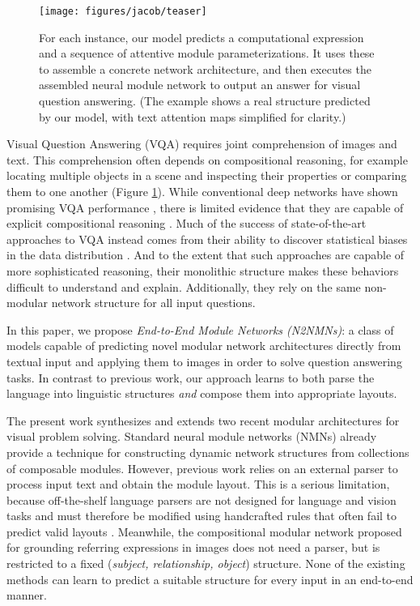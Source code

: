 \documentclass[10pt,twocolumn,letterpaper]{article}
\begin{document}
\begin{figure}[t]
\center
\texttt{[image: figures/jacob/teaser]}\vspace{-0.8cm}
\caption{For each instance, our model predicts a computational expression and a sequence of attentive module parameterizations. It uses these to assemble a concrete network architecture, and then executes the assembled neural module network to output an answer for visual question answering. (The
example shows a real structure predicted by our model, with text attention maps
simplified for clarity.)}
\label{fig:teaser}
\vspace{-0.5cm}
\end{figure}

Visual Question Answering (VQA) requires joint comprehension of images and text. This comprehension often depends on compositional reasoning, for example locating multiple objects in a scene and inspecting their properties or comparing them to one another (Figure \ref{fig:teaser}). While conventional deep networks have shown promising VQA performance \cite{fukui16emnlp}, there is limited evidence that they are capable of explicit compositional reasoning \cite{johnson2017clevr}. Much of the success of state-of-the-art approaches to VQA instead comes from their ability to discover statistical biases in the data distribution \cite{goyal2016vqa2}. And to the extent that such approaches are capable of more sophisticated reasoning, their monolithic structure makes these behaviors difficult to understand and explain. Additionally, they rely on the same non-modular network structure for all input questions. 

In this paper, we propose \textit{End-to-End Module Networks (N2NMNs)}: a class of models capable of predicting novel modular network architectures directly from textual input and applying them to images in order to solve question answering tasks. In contrast to previous work, our approach learns to both parse the language into linguistic structures \textit{and} compose them into appropriate layouts. 

The present work synthesizes and extends two recent modular architectures for visual problem solving. Standard neural module networks (NMNs) \cite{andreas16neural} already provide a technique for constructing dynamic network structures from collections of composable modules. However, previous work relies on an external parser to process input text and obtain the module layout. This is a serious limitation, because off-the-shelf language parsers are not designed for language and vision tasks and must therefore be modified using handcrafted rules that often fail to predict valid layouts \cite{johnson2017clevr}. Meanwhile, the compositional modular network \cite{hu2017modeling} proposed for grounding referring expressions in images does not need a parser, but is restricted to a fixed (\textit{subject, relationship, object}) structure. None of the existing methods can learn to predict a suitable structure for every input in an end-to-end manner.
\end{document}
